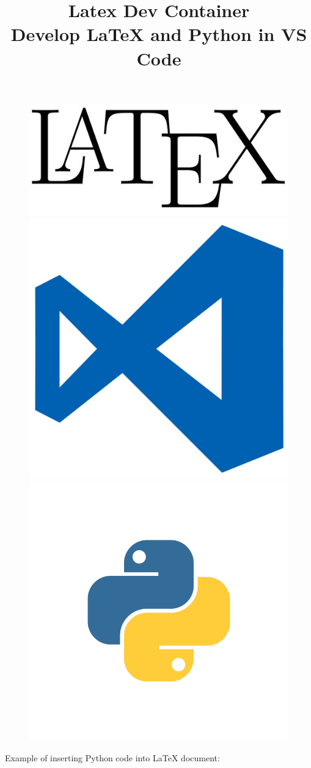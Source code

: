 \documentclass{article}
\begin{document}
\title{Latex Dev Container \\ \small{Develop LaTeX and Python in VS Code}}
\date{}
\maketitle

\vspace*{-20mm}

\begin{figure}[htp]
      \centering
      \includegraphics[valign=c,width=.3\textwidth]{./img/latex.jpg}\hfill
      \includegraphics[valign=c,width=.2\textwidth]{./img/vscode.jpg}\hfill
      \includegraphics[valign=c,width=.3\textwidth]{./img/python.png}
\end{figure}

Example of inserting Python code into LaTeX document:
\inputminted[firstline=1, lastline=17]{python}{./src/main.py}
\end{document}
